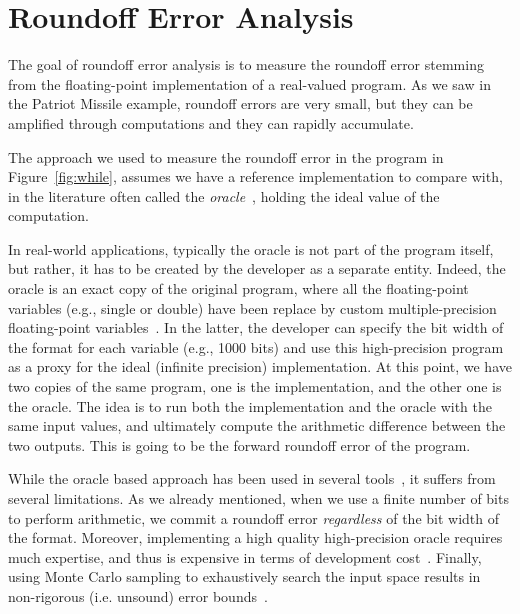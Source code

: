 \section{Roundoff Error Analysis}
%
The goal of roundoff error analysis is to measure the roundoff error stemming from the floating-point implementation of a real-valued program.
%
As we saw in the Patriot Missile example, roundoff errors are very small, but they can be amplified through computations and they can rapidly accumulate.
%
%
%

The approach we used to measure the roundoff error in the program in Figure~\ref{fig:while}, assumes we have a reference implementation to compare with, in the literature often called the \emph{oracle}~\cite{blame}, holding the ideal value of the computation.
%
% 

In real-world applications, typically the oracle is not part of the program itself, but rather, it has to be created by the developer as a separate entity.
%
Indeed, the oracle is an exact copy of the original program, where all the floating-point variables (e.g., single or double) have been replace by custom multiple-precision floating-point variables~\cite{mpfr}.
%
In the latter, the developer can specify the bit width of the format for each variable (e.g., 1000 bits) and use this high-precision program as a proxy for the ideal (infinite precision) implementation.
%
At this point, we have two copies of the same program, one is the implementation, and the other one is the oracle. 
%
The idea is to run both the implementation and the oracle with the same input values, and ultimately compute the arithmetic difference between the two outputs. 
%
This is going to be the forward roundoff error of the program. 
%

While the oracle based approach has been used in several tools~\cite{landau2014guide, kahan1996improbability, atomic, blame, herbie}, it suffers from several limitations.
%
As we already mentioned, when we use a finite number of bits to perform arithmetic, we commit a roundoff error \emph{regardless} of the bit width of the format.
%
%
Moreover, implementing a high quality high-precision oracle requires much expertise, and thus is expensive in terms of development cost~\cite{atomic}.
%
Finally, using Monte Carlo sampling to exhaustively search the input space results in non-rigorous (i.e. unsound) error bounds~\cite{glasserman2013monte, parker2000monte}.
%

